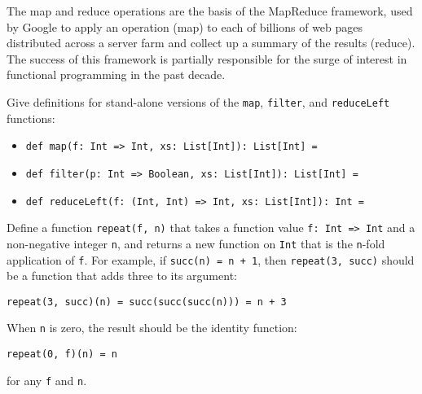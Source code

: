 \begin{tailquote}
The map and reduce operations are the basis of the MapReduce framework, used by Google to apply an operation (map) to each of billions of web pages distributed across a server farm and collect up a summary of the results (reduce). The success of this framework is partially responsible for the surge of interest in functional programming in the past decade.
\end{tailquote}
\begin{exercises}
\item Give definitions for stand-alone versions of the \verb|map|, \verb|filter|, and \verb|reduceLeft| functions:
\begin{itemize}
\item \verb|def map(f: Int => Int, xs: List[Int]): List[Int] =|
\item \verb|def filter(p: Int => Boolean, xs: List[Int]): List[Int] =|
\item \verb|def reduceLeft(f: (Int, Int) => Int, xs: List[Int]): Int =|
\end{itemize}

\item Define a function \verb|repeat(f, n)| that takes a function value \verb|f: Int => Int| and a non-negative integer \verb|n|, and returns a new function on \verb|Int| that is the \verb|n|-fold application of \verb|f|. For example, if \verb|succ(n) = n + 1|, then \verb|repeat(3, succ)| should be a function that adds three to its argument:
\begin{verbatim}
repeat(3, succ)(n) = succ(succ(succ(n))) = n + 3
\end{verbatim}
When \verb|n| is zero, the result should be the identity function:
\begin{verbatim}
repeat(0, f)(n) = n
\end{verbatim}
for any \verb|f| and \verb|n|.


\end{exercises}

